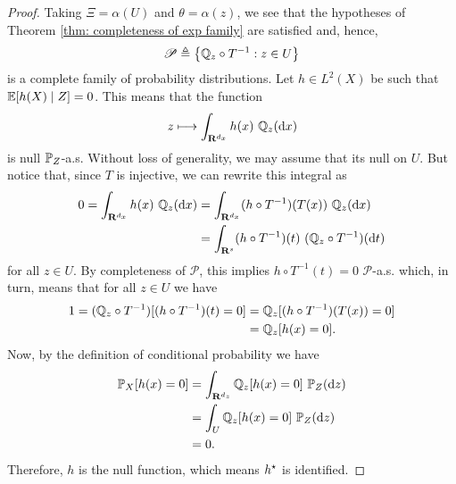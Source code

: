 \begin{proof}
    Taking $ \Xi = \alpha ( U ) $ and $ \theta = \alpha ( z ) $, we see that the hypotheses of Theorem \ref{thm: completeness of exp family} are satisfied and, hence,
    \begin{equation*}
        \mathscr{P} \triangleq \left\{ \mathbb{Q}_{ z } \circ T^{ -1 } : z \in U \right\}
    \end{equation*}
    is a complete family of probability distributions.
    Let $ h \in L^2 ( X ) $ be such that $ \mathbb{E} [ h ( X ) \mid Z ] = 0 $.
    This means that the function
    \begin{equation*}
        z \longmapsto \int_{ \mathbf{R}^{ d_{ x } } } h ( x ) \ \mathbb{Q}_{ z } ( \mathrm{d} x )
    \end{equation*}
    is null $ \mathbb{P}_{ Z } $-a.s.
    Without loss of generality, we may assume that its null on $ U $.
    But notice that, since $ T $ is injective, we can rewrite this integral as
    \begin{align*}
        0 = \int_{ \mathbf{R}^{ d_{ x } } } h ( x ) \ \mathbb{Q}_{ z } ( \mathrm{d} x )
        &= \int_{ \mathbf{R}^{ d_{ x } } } ( h \circ T^{ -1 } ) ( T ( x ) ) \ \mathbb{Q}_{ z } ( \mathrm{d} x ) \\
        &= \int_{ \mathbf{R}^{ s } } ( h \circ T^{ -1 } ) ( t )  \ ( \mathbb{Q}_{ z } \circ T^{ -1 } ) ( \mathrm{d} t )
    \end{align*}
    for all $ z \in U $.
    By completeness of $ \mathscr{P} $, this implies $ h \circ T^{ -1 } ( t ) = 0 $ $ \mathscr{P} $-a.s. which, in turn, means that for all $ z \in U $ we have
    \begin{align*}
        1 = ( \mathbb{Q}_{ z } \circ T^{ -1 } ) [ ( h \circ T^{ -1 } ) ( t ) = 0 ]
        &= \mathbb{Q}_{ z } [ ( h \circ T^{ -1 } ) ( T ( x ) ) = 0 ] \\
        &= \mathbb{Q}_{ z } [ h ( x ) = 0 ]
    .\end{align*}
    Now, by the definition of conditional probability we have
    \begin{align*}
        \prob_{ X } [ h ( x ) = 0 ]
        &= \int_{ \R^{ d_{ z } } } \probq_{ z } [ h ( x ) = 0 ] \ \prob_{ Z } ( \ddrm z ) \\
        &= \int_{ U } \probq_{ z } [ h ( x ) = 0 ] \ \prob_{ Z } ( \ddrm z ) \\
        &= 0
    .\end{align*}
    Therefore, $ h $ is the null function, which means $ h^{ \star } $ is identified.
\end{proof}


